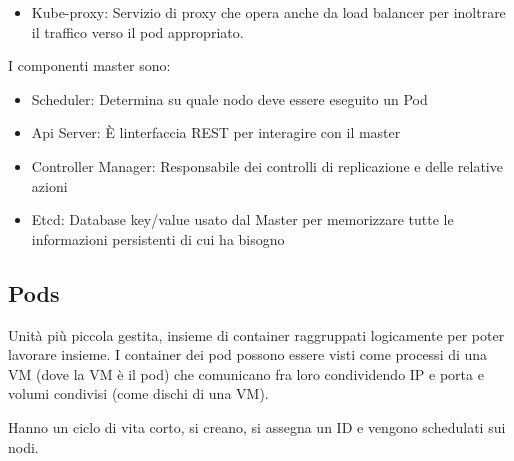 \documentclass[
]{article}
\providecommand{\tightlist}{%
  \setlength{\itemsep}{0pt}\setlength{\parskip}{0pt}}
\begin{document}
{}

\begin{itemize}
\tightlist
\item
  {Kube-proxy}{: Servizio di proxy che opera anche da load balancer per
  inoltrare il traffico verso il pod appropriato.}
\end{itemize}

{}

{I componenti master sono:}

\begin{itemize}
\tightlist
\item
  {Scheduler}{: Determina su quale nodo deve essere eseguito un Pod }
\end{itemize}

{}

\begin{itemize}
\tightlist
\item
  {Ap}{i }{Server}{: È l\textquotesingle interfaccia REST per interagire
  con il master }
\end{itemize}

{}

\begin{itemize}
\tightlist
\item
  {Controller Manager}{: Responsabile dei controlli di replicazione e
  delle relative azioni}
\end{itemize}

{}

\begin{itemize}
\tightlist
\item
  {Etcd}{: Database key/value usato dal Master per memorizzare tutte le
  informazioni persistenti di cui ha bisogno}
\end{itemize}

{}

\subsection{\texorpdfstring{{Pods}}{Pods}}\label{h.jco7y64z5kiw}

{Unità più piccola gestita, insieme di container raggruppati logicamente
per poter lavorare insieme. I container dei pod possono essere visti
come processi di una VM (dove la VM è il pod) che comunicano fra loro
condividendo IP e porta e volumi condivisi (come dischi di una VM).}

{}

{Hanno un ciclo di vita corto, si creano, si assegna un ID e vengono
schedulati sui nodi.}
\end{document}
